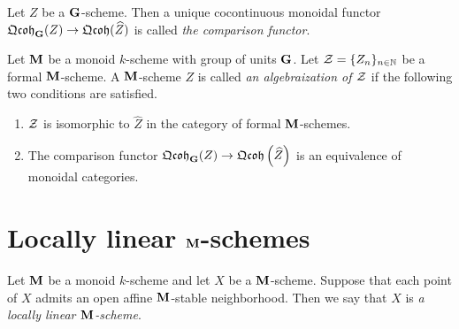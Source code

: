 \begin{definition}
Let $Z$ be a $\mathbf{G}$-scheme. Then a unique cocontinuous monoidal functor $\mathfrak{Qcoh}_{\mathbf{G}}(Z)\rightarrow \mathfrak{Qcoh}(\widehat{Z})$ is called \textit{the comparison functor}.
\end{definition}

\begin{definition}
Let $\mathbf{M}$ be a monoid $k$-scheme with group of units $\mathbf{G}$. Let ${\mathcal Z} = \{Z_n\}_{n\in \mathbb{N}}$ be a formal $\mathbf{M}$-scheme. A $\mathbf{M}$-scheme $Z$ is called \textit{an algebraization of ${\mathcal Z}$} if the following two conditions are satisfied.
\begin{enumerate}[label=\textbf{(\arabic*)}, leftmargin=1.5em]
\item ${\mathcal Z}$ is isomorphic to $\widehat{Z}$ in the category of formal $\mathbf{M}$-schemes.
\item The comparison functor $\mathfrak{Qcoh}_{\mathbf{G}}(Z)\rightarrow \mathfrak{Qcoh}\left(\widehat{Z}\right)$ is an equivalence of monoidal categories.
\end{enumerate}
\end{definition}

\section{Locally linear $\mathbf{M}$-schemes}

\begin{definition}
Let $\mathbf{M}$ be a monoid $k$-scheme and let $X$ be a $\mathbf{M}$-scheme. Suppose that each point of $X$ admits an open affine $\mathbf{M}$-stable neighborhood. Then we say that $X$ is \textit{a locally linear $\mathbf{M}$-scheme}.
\end{definition}

